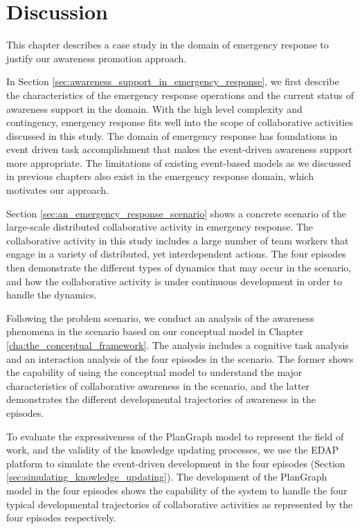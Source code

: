 \section{Discussion} %
\label{sec:summary_and_discussion}
This chapter describes a case study in the domain of emergency response to justify our awareness promotion approach. 

In Section \ref{sec:awareness_support_in_emergency_response}, we first describe the characteristics of the emergency response operations and the current status of awareness support in the domain. With the high level complexity and contingency, emergency response fits well into the scope of collaborative activities discussed in this study. The domain of emergency response has foundations in event driven task accomplishment that makes the event-driven awareness support more appropriate. The limitations of existing event-based models as we discussed in previous chapters also exist in the emergency response domain, which motivates our approach.

Section \ref{sec:an_emergency_response_scenario} shows a concrete scenario of the large-scale distributed collaborative activity in emergency response. The collaborative activity in this study includes a large number of team workers that engage in a variety of distributed, yet interdependent actions. The four episodes then demonstrate the different types of dynamics that may occur in the scenario, and how the collaborative activity is under continuous development in order to handle the dynamics.

Following the problem scenario, we conduct an analysis of the awareness phenomena in the scenario based on our conceptual model in Chapter \ref{cha:the_conceptual_framework}. The analysis includes a cognitive task analysis and an interaction analysis of the four episodes in the scenario. The former shows the capability of using the conceptual model to understand the major characteristics of collaborative awareness in the scenario, and the latter demonstrates the different developmental trajectories of awareness in the episodes.

To evaluate the expressiveness of the PlanGraph model to represent the field of work, and the validity of the knowledge updating processes, we use the EDAP platform to simulate the event-driven development in the four episodes (Section \ref{sec:simulating_knowledge_updating}). The development of the PlanGraph model in the four episodes shows the capability of the system to handle the four typical developmental trajectories of collaborative activities as represented by the four episodes respectively. 

